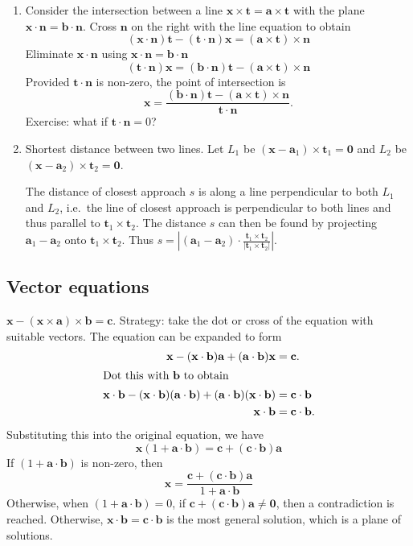 \documentclass[a4paper]{article}
\begin{document}
\begin{eg}\leavevmode
  \begin{enumerate}
    \item Consider the intersection between a line $\mathbf{x\times t = a\times t}$ with the plane $\mathbf{x\cdot n = b\cdot n}$. Cross $\mathbf{n}$ on the right with the line equation to obtain
      \[
        \mathbf{(x\cdot n)t - (t\cdot n)x = (a\times t)\times n}
      \]
      Eliminate $\mathbf{x\cdot n}$ using $\mathbf{x\cdot n = b\cdot n}$
      \[
        \mathbf{(t\cdot n)x = (b\cdot n)t - (a\times t)\times n}
      \]
      Provided $\mathbf{t\cdot n}$ is non-zero, the point of intersection is
      \[
        \mathbf{x = \frac{(b\cdot n)t - (a\times t)\times n}{t\cdot n}}.
      \]
      Exercise: what if $\mathbf{t\cdot n} = 0$?
    \item Shortest distance between two lines. Let $L_1$ be $(\mathbf{x} - \mathbf{a}_1)\times \mathbf{t}_1 = \mathbf{0}$ and $L_2$ be $(\mathbf{x} - \mathbf{a}_2)\times \mathbf{t}_2 = \mathbf{0}$.

      The distance of closest approach $s$ is along a line perpendicular to both $L_1$ and $L_2$, i.e.\ the line of closest approach is perpendicular to both lines and thus parallel to $\mathbf{t}_1\times \mathbf{t}_2$. The distance $s$ can then be found by projecting $\mathbf{a}_1 - \mathbf{a}_2$ onto $\mathbf{t}_1\times \mathbf{t}_2$. Thus $s = \left|(\mathbf{a}_1 - \mathbf{a}_2)\cdot\frac{\mathbf{t}_1\times \mathbf{t}_2}{|\mathbf{t}_1\times \mathbf{t}_2|}\right|$.
  \end{enumerate}
\end{eg}
\subsection{Vector equations}
\begin{eg}
  $\mathbf{x - (x\times a)\times b = c}$. Strategy: take the dot or cross of the equation with suitable vectors. The equation can be expanded to form
  \begin{align*}
    \mathbf{x - (x\cdot b)a + (a\cdot b)x} &= \mathbf{c}.\\
    \intertext{Dot this with $\mathbf{b}$ to obtain}
    \mathbf{x\cdot b - (x\cdot b)(a\cdot b) + (a\cdot b)(x\cdot b)} &= \mathbf{c\cdot b}\\
    \mathbf{x\cdot b} &= \mathbf{c\cdot b}.
  \end{align*}
  Substituting this into the original equation, we have
  \[
    \mathbf{x}(1 + \mathbf{a\cdot b}) = \mathbf{c + (c\cdot b)a}
  \]
  If $(1 + \mathbf{a \cdot b})$ is non-zero, then
  \[
    \mathbf{x} = \frac{\mathbf{c + (c\cdot b)a}}{1 + \mathbf{a\cdot b}}
  \]
  Otherwise, when $(1 + \mathbf{a\cdot b}) = 0$, if $\mathbf{c + (c\cdot b)a \not= 0}$, then a contradiction is reached. Otherwise, $\mathbf{x\cdot b = c\cdot b}$ is the most general solution, which is a plane of solutions.
\end{eg}
\end{document}
